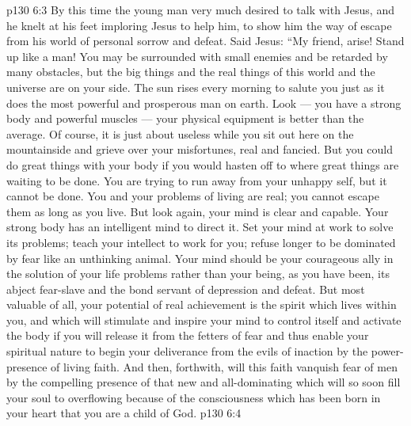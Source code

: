 \vs p130 6:3 By this time the young man very much desired to talk with Jesus, and he knelt at his feet imploring Jesus to help him, to show him the way of escape from his world of personal sorrow and defeat. Said Jesus: “My friend, arise! Stand up like a man! You may be surrounded with small enemies and be retarded by many obstacles, but the big things and the real things of this world and the universe are on your side. The sun rises every morning to salute you just as it does the most powerful and prosperous man on earth. Look --- you have a strong body and powerful muscles --- your physical equipment is better than the average. Of course, it is just about useless while you sit out here on the mountainside and grieve over your misfortunes, real and fancied. But you could do great things with your body if you would hasten off to where great things are waiting to be done. You are trying to run away from your unhappy self, but it cannot be done. You and your problems of living are real; you cannot escape them as long as you live. But look again, your mind is clear and capable. Your strong body has an intelligent mind to direct it. Set your mind at work to solve its problems; teach your intellect to work for you; refuse longer to be dominated by fear like an unthinking animal. Your mind should be your courageous ally in the solution of your life problems rather than your being, as you have been, its abject fear\hyp{}slave and the bond servant of depression and defeat. But most valuable of all, your potential of real achievement is the spirit which lives within you, and which will stimulate and inspire your mind to control itself and activate the body if you will release it from the fetters of fear and thus enable your spiritual nature to begin your deliverance from the evils of inaction by the power\hyp{}presence of living faith. And then, forthwith, will this faith vanquish fear of men by the compelling presence of that new and all\hyp{}dominating  which will so soon fill your soul to overflowing because of the consciousness which has been born in your heart that you are a child of God.
\vs p130 6:4 

